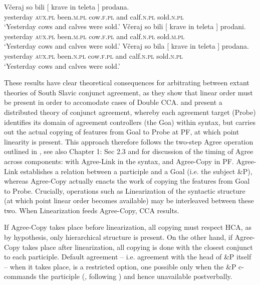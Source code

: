 \documentclass[output=paper
,modfonts
,nonflat]{langsci/langscibook}
\begin{document}
\begin{exe} 
\ex
\begin{xlist}
\ex \gll *Včeraj      so    bili       [ krave    in    teleta ]    prodana.\\
yesterday \textsc{aux.pl} been.\textsc{m.pl} {} cow.\textsc{f.pl} and calf.\textsc{n.pl} {}   sold.\textsc{n.pl} \\
\glt `Yesterday cows and calves were sold.' 
\ex \gll *Včeraj      so    bili       [ krave    in    teleta ]    prodani.\\
yesterday \textsc{aux.pl} been.\textsc{m.pl} {} cow.\textsc{f.pl} and calf.\textsc{n.pl} {}   sold.\textsc{m.pl} \\
\glt `Yesterday cows and calves were sold.' 
\ex \gll *Včeraj      so    bila       [ krave    in    teleta ]    prodana.\\
yesterday \textsc{aux.pl} been.\textsc{n.pl} {} cow.\textsc{f.pl} and calf.\textsc{n.pl} {}   sold.\textsc{n.pl} \\
\glt `Yesterday cows and calves were sold.' 
\end{xlist}
\end{exe}
These results have clear theoretical consequences for arbitrating between extant theories of South Slavic conjunct agreement, as they show that linear order must be present in order to accomodate cases of Double CCA. \cite{marusicnevinsbadecker:15} and \cite{willergold:16} present a distributed theory of conjunct agreement, whereby each agreement target (Probe) identifies its domain of agreement controllers (the Goa) within syntax, but carries out the actual copying of features from Goal to Probe at PF, at which point linearity is present. This approach therefore follows the two-step Agree operation outlined in  \citet{arregi-nevins:12}, see also Chapter 1: Sec 2.3 and  for discussion of the timing of Agree across components: with Agree-Link in the syntax, and Agree-Copy in PF. Agree-Link establishes a relation between a participle and a Goal (i.e. the subject \&P), whereas Agree-Copy actually enacts the work of copying the features from Goal to Probe. Crucially, operations such as Linearization of the syntactic structure (at which point linear order becomes available) may be interleaved between these two. When Linearization feeds Agree-Copy, CCA results. 

If Agree-Copy takes place before linearization, all copying must respect HCA, as by hypothesis, only hierarchical structure is present. On the other hand, if Agree-Copy takes place after linearization, all copying is done with the closest conjunct to each participle. Default agreement -- i.e. agreement with the head of \&P itself --  when it takes place, is a restricted option, one possible only when the \&P c-commands the participle (\citealt{willergold:16}, following \citealt{smith:17a}) and hence unavailable postverbally.
\end{document}
